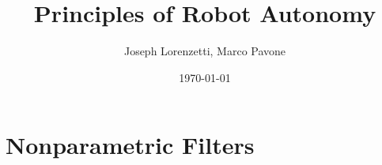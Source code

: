 \documentclass[nohyper,nobib]{tufte-book}
\title{Principles of Robot Autonomy}
\author{Joseph Lorenzetti, Marco Pavone}
\date{\today}
\begin{document}
\chapter{Nonparametric Filters}


\printbibliography
\end{document}
